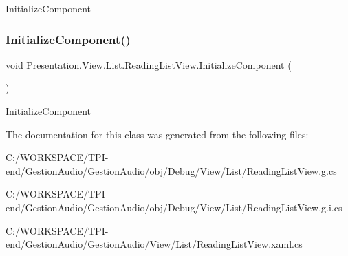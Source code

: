 Initialize\+Component 

\mbox{\label{class_presentation_1_1_view_1_1_list_1_1_reading_list_view_ac889482272d93e01a46d543e008f0e05}} 
\subsubsection{\texorpdfstring{Initialize\+Component()}{InitializeComponent()}\hspace{0.1cm}{\footnotesize\ttfamily [4/4]}}
{\footnotesize\ttfamily void Presentation.\+View.\+List.\+Reading\+List\+View.\+Initialize\+Component (\begin{DoxyParamCaption}{ }\end{DoxyParamCaption})}



Initialize\+Component 



The documentation for this class was generated from the following files\+:\begin{DoxyCompactItemize}
\item 
C\+:/\+W\+O\+R\+K\+S\+P\+A\+C\+E/\+T\+P\+I-\/end/\+Gestion\+Audio/\+Gestion\+Audio/obj/\+Debug/\+View/\+List/Reading\+List\+View.\+g.\+cs\item 
C\+:/\+W\+O\+R\+K\+S\+P\+A\+C\+E/\+T\+P\+I-\/end/\+Gestion\+Audio/\+Gestion\+Audio/obj/\+Debug/\+View/\+List/Reading\+List\+View.\+g.\+i.\+cs\item 
C\+:/\+W\+O\+R\+K\+S\+P\+A\+C\+E/\+T\+P\+I-\/end/\+Gestion\+Audio/\+Gestion\+Audio/\+View/\+List/Reading\+List\+View.\+xaml.\+cs\end{DoxyCompactItemize}
